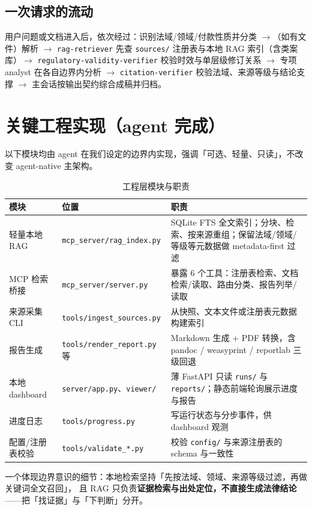 \documentclass[a4paper,11pt]{ctexart}
\newcommand{\id}[1]{\texttt{#1}}
\begin{document}
\subsection{一次请求的流动}
用户问题或文档进入后，依次经过：识别法域/领域/付款性质并分类 $\rightarrow$（如有文件）解析 $\rightarrow$
\id{rag-retriever} 先查 \id{sources/} 注册表与本地 RAG 索引（含类案库）$\rightarrow$
\id{regulatory-validity-verifier} 校验时效与单层级修订关系 $\rightarrow$ 专项 analyst 在各自边界内分析 $\rightarrow$
\id{citation-verifier} 校验法域、来源等级与结论支撑 $\rightarrow$ 主会话按输出契约综合成稿并归档。

\section{关键工程实现（agent 完成）}

以下模块均由 agent 在我们设定的边界内实现，强调「可选、轻量、只读」，不改变 agent-native 主架构。

\begin{table}[h]\centering\small
\caption{工程层模块与职责}\label{tab:eng}
\begin{tabular}{p{3.0cm}p{4.6cm}p{6.2cm}}
\toprule
\textbf{模块} & \textbf{位置} & \textbf{职责} \\
\midrule
轻量本地 RAG & \id{mcp\_server/rag\_index.py} & SQLite FTS 全文索引；分块、检索、按来源重组；保留法域/领域/等级等元数据做 metadata-first 过滤 \\
MCP 检索桥接 & \id{mcp\_server/server.py} & 暴露 6 个工具：注册表检索、文档检索/读取、路由分类、报告列举/读取 \\
来源采集 CLI & \id{tools/ingest\_sources.py} & 从快照、文本文件或注册表元数据构建索引 \\
报告生成 & \id{tools/render\_report.py} 等 & Markdown 生成 + PDF 转换，含 pandoc / weasyprint / reportlab 三级回退 \\
本地 dashboard & \id{server/app.py}、\id{viewer/} & 薄 FastAPI 只读 \id{runs/} 与 \id{reports/}；静态前端轮询展示进度与报告 \\
进度日志 & \id{tools/progress.py} & 写运行状态与分步事件，供 dashboard 观测 \\
配置/注册表校验 & \id{tools/validate\_*.py} & 校验 \id{config/} 与来源注册表的 schema 与一致性 \\
\bottomrule
\end{tabular}
\end{table}

一个体现边界意识的细节：本地检索坚持「先按法域、领域、来源等级过滤，再做关键词全文召回」，
且 RAG 只负责\textbf{证据检索与出处定位，不直接生成法律结论}——把「找证据」与「下判断」分开。
\end{document}
